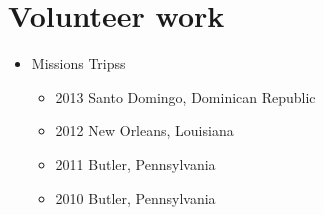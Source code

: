 \message{ !name(main.tex)}\documentclass[11pt,a4paper,sans]{moderncv}        %
\begin{document}
\section{Volunteer work}
\begin{itemize}
\item {Missions Tripss 
    \begin{itemize}
    \item 2013 Santo Domingo, Dominican Republic
    \item 2012 New Orleans, Louisiana
    \item 2011 Butler, Pennsylvania
    \item 2010 Butler, Pennsylvania
    \end{itemize}}
\end{itemize}
\end{document}
